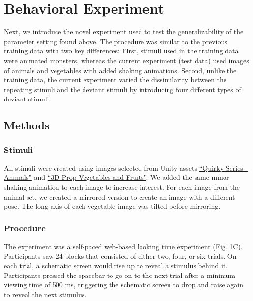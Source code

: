 \documentclass[10pt, letterpaper]{article}
\begin{document}
\hypertarget{behavioral-experiment}{%
\section{Behavioral Experiment}\label{behavioral-experiment}}

Next, we introduce the novel experiment used to test the
generalizability of the parameter setting found above. The procedure was
similar to the previous training data with two key differences: First,
stimuli used in the training data were animated monsters, whereas the
current experiment (test data) used images of animals and vegetables
with added shaking animations. Second, unlike the training data, the
current experiment varied the dissimilarity between the repeating
stimuli and the deviant stimuli by introducing four different types of
deviant stimuli.

\hypertarget{methods}{%
\subsection{Methods}\label{methods}}

\hypertarget{stimuli}{%
\subsubsection{Stimuli}\label{stimuli}}

All stimuli were created using images selected from Unity assets
\href{https://assetstore.unity.com/packages/3d/characters/animals/quirky-series-animals-mega-pack-vol-2-183280}{``Quirky
Series - Animals''} and
\href{https://assetstore.unity.com/packages/3d/props/food/3d-prop-vegetables-and-fruits-237790}{``3D
Prop Vegetables and Fruits''}. We added the same minor shaking animation
to each image to increase interest. For each image from the animal set,
we created a mirrored version to create an image with a different pose.
The long axis of each vegetable image was tilted before mirroring.

\hypertarget{procedure}{%
\subsubsection{Procedure}\label{procedure}}

The experiment was a self-paced web-based looking time experiment (Fig.
1C). Participants saw 24 blocks that consisted of either two, four, or
six trials. On each trial, a schematic screen would rise up to reveal a
stimulus behind it. Participants pressed the spacebar to go on to the
next trial after a minimum viewing time of 500 ms, triggering the
schematic screen to drop and raise again to reveal the next stimulus.
\end{document}
